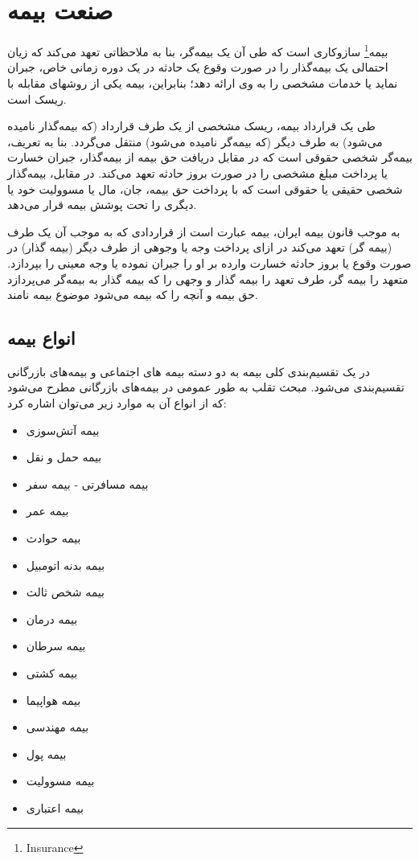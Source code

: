 \documentclass[paper=a4, fontsize=11pt]{article}
\numberwithin{equation}{section} %
\numberwithin{figure}{section} %
\numberwithin{table}{section} %
\begin{document}
\newpage

\section{صنعت بیمه}
\par
بیمه\footnote{Insurance} سازوکاری است که طی آن یک بیمه‌گر، بنا به ملاحظاتی تعهد می‌کند که زیان احتمالی یک بیمه‌گذار را در صورت وقوع یک حادثه در یک دوره زمانی خاص، جبران نماید یا خدمات مشخصی را به وی ارائه دهد؛ بنابراین، بیمه یکی از روشهای مقابله با ریسک است.
\par
طی یک قرارداد بیمه، ریسک مشخصی از یک طرف قرارداد (که بیمه‌گذار نامیده می‌شود) به طرف دیگر (که بیمه‌گر نامیده می‌شود) منتقل می‌گردد. بنا به تعریف، بیمه‌گر شخصی حقوقی است که در مقابل دریافت حق بیمه از بیمه‌گذار، جبران خسارت یا پرداخت مبلغ مشخصی را در صورت بروز حادثه تعهد می‌کند. در مقابل، بیمه‌گذار شخصی حقیقی یا حقوقی است که با پرداخت حق بیمه، جان، مال یا مسوولیت خود یا دیگری را تحت پوشش بیمه قرار می‌دهد.
\par
به موجب قانون بیمه ایران، بیمه عبارت است از قراردادی که به موجب آن یک طرف (بیمه گر) تعهد می‌کند در ازای پرداخت وجه یا وجوهی از طرف دیگر (بیمه گذار) در صورت وقوع یا بروز حادثه خسارت وارده بر او را جبران نموده یا وجه معینی را بپردازد. متعهد را بیمه گر، طرف تعهد را بیمه گذار و وجهی را که بیمه گذار به بیمه‌گر می‌پردازد حق بیمه و آنچه را که بیمه می‌شود موضوع بیمه نامند.

\subsection{انواع بیمه}
\par
در یک تقسیم‌بندی کلی بیمه به دو دسته بیمه های اجتماعی و بیمه‌های بازرگانی تقسیم‌بندی می‌شود.
مبحث تقلب به طور عمومی در بیمه‌های بازرگانی مطرح می‌شود که از انواع آن به موارد زیر می‌توان اشاره کرد:

\begin{itemize}
    \item بیمه آتش‌سوزی   
    \item بیمه حمل و نقل
    \item بیمه مسافرتی - بیمه سفر
    \item بیمه عمر
    \item بیمه حوادث
    \item بیمه بدنه اتومبیل
    \item بیمه شخص ثالث
    \item بیمه درمان
    \item بیمه سرطان
    \item بیمه کشتی
    \item بیمه هواپیما
    \item بیمه مهندسی
    \item بیمه پول
    \item بیمه مسوولیت
    \item بیمه اعتباری
\end{itemize}
\end{document}
